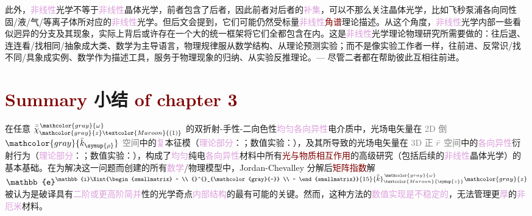 此外，\textcolor{Plum}{非线性}\textcolor{NavyBlue}{光学}不等于\textcolor{Plum}{非线性}\textcolor{PineGreen}{晶体光学}，前者包含了后者，因此前者对后者的\textcolor{Plum}{补集}，可以不那么关注\textcolor{PineGreen}{晶体光学}，比如\textcolor{NavyBlue}{飞秒泵浦}各向同性\textcolor{NavyBlue}{固}/\textcolor{NavyBlue}{液}/\textcolor{NavyBlue}{气}/\textcolor{NavyBlue}{等离子体}所对应的\textcolor{Plum}{非线性}\textcolor{NavyBlue}{光学}。但后文会提到，它们可能仍然受标量\textcolor{Plum}{非线性}\textcolor{Maroon}{角谱}理论描述。从这个角度，\textcolor{Plum}{非线性}\textcolor{NavyBlue}{光学}内部一些看似迥异的分支及其现象，实际上背后或许存在一个大的统一框架将它们全都包含在内。这是\textcolor{Plum}{非线性}\textcolor{NavyBlue}{光学}\textcolor{NavyBlue}{理论物理}研究所需要做的：往后退、连连看/找相同/抽象成大类、数学为主导语言，物理规律服从数学结构、从理论预测实验；而不是像实验工作者一样，往前进、反常识/找不同/具象成实例、数学作为描述工具，服务于物理现象的归纳、从实验反推理论。--- 尽管二者都在帮助彼此互相往前进。

\vspace*{-1.5em}

\section{\textcolor{Maroon}{Summary} 小结 \textcolor{Maroon}{of chapter 3}}\label{sec:summary-chapter3}

在任意 $\bar{\bar{\chi}}^{\;\! \mathcolor{gray}{\omega}}_{\mathcolor{gray}{z} \textcolor{Maroon}{(1)}}$ 的\textcolor{NavyBlue}{双折射}-\textcolor{NavyBlue}{手性}-\textcolor{NavyBlue}{二向色性}\textcolor{Plum}{均匀}\textcolor{Plum}{各向异性}电介质中，\textcolor{PineGreen}{光场电矢量}在 \textcolor{gray}{2D 倒} $\mathcolor{gray}{\bar{k}_{\symup{\rho}}}$ \textcolor{gray}{空间}中的\textcolor{Plum}{复}\textcolor{PineGreen}{本征模}（\textcolor{Plum}{理论部分}：；\textcolor{NavyBlue}{数值实验}：），及其所导致的\textcolor{PineGreen}{光场电矢量}在 \textcolor{gray}{3D 正} $\mathcolor{gray}{\bar{r}}$ \textcolor{gray}{空间}中的\textcolor{Plum}{各向异性}衍射行为（\textcolor{Plum}{理论部分}：；\textcolor{NavyBlue}{数值实验}：），构成了\textcolor{Plum}{均匀}纯电\textcolor{Plum}{各向异性}材料中所有\textcolor{Maroon}{光与物质相互作用}的高级研究（包括后续的\textcolor{Plum}{非线性}\textcolor{PineGreen}{晶体光学}）的基本基础。在为解决这一问题而创建的所有\textcolor{Plum}{数学}/\textcolor{NavyBlue}{物理模型}中，\textcolor{PineGreen}{Jordan-Chevalley 分解}后\textcolor{Maroon}{矩阵指数}解 $\mathbb{e}^{\mathbb{i} \Xint{\begin{smallmatrix} ~ \\ {}^{}_{\mathcolor{gray}{-}} \\ ~ \end{smallmatrix}}{15}{\bar{\bar{k}}}_{\textcolor{Maroon}{\symup{z}}}^{\;\! \mathcolor{gray}{\omega}} \mathcolor{gray}{z}}$ 被认为是破译具有\textcolor{Plum}{二阶或更高阶简并}性的\textcolor{PineGreen}{光学奇点}\textcolor{Plum}{内部结构}的最有可能的关键。然而，这种方法的\textcolor{Plum}{数值实现是不稳定的}，无法管理更\textcolor{Plum}{厚}的\textcolor{Plum}{非厄米}材料。

